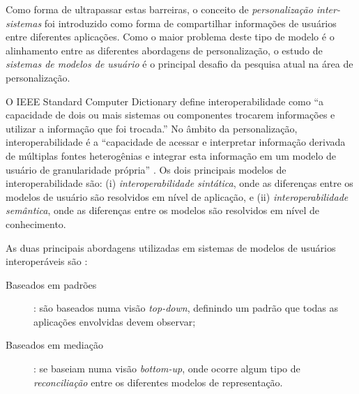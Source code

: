 Como forma de ultrapassar estas barreiras, o conceito de \emph{personalização inter-sistemas} foi introduzido \cite{niederee04} como forma de compartilhar informações de usuários entre diferentes aplicações. Como o maior problema deste tipo de modelo é o alinhamento entre as diferentes abordagens de personalização, o estudo de \emph{sistemas de modelos de usuário} é o principal desafio da pesquisa atual na área de personalização.\cite{viviani10}

O IEEE Standard Computer Dictionary \cite{ieeedict} define interoperabilidade como ``a capacidade de dois ou mais sistemas ou componentes trocarem informações e utilizar a informação que foi trocada.'' No âmbito da personalização, interoperabilidade é a ``capacidade de acessar e interpretar informação derivada de múltiplas fontes heterogênias e integrar esta informação em um modelo de usuário de granularidade própria'' \cite{carmagnola09}. Os dois principais modelos de interoperabilidade são: (i) \emph{interoperabilidade sintática}, onde as diferenças entre os modelos de usuário são resolvidos em nível de aplicação, e (ii) \emph{interoperabilidade semântica}, onde as diferenças entre os modelos são resolvidos em nível de conhecimento.

As duas principais abordagens utilizadas em sistemas de modelos de usuários interoperáveis são \cite{viviani10}:

\begin{description}

  \item[Baseados em padrões]: são baseados numa visão \emph{top-down}, definindo um padrão que todas as aplicações envolvidas devem observar;
  \item[Baseados em mediação]: se baseiam numa visão \emph{bottom-up}, onde ocorre algum tipo de \emph{reconciliação} entre os diferentes modelos de representação.

\end{description}

%


